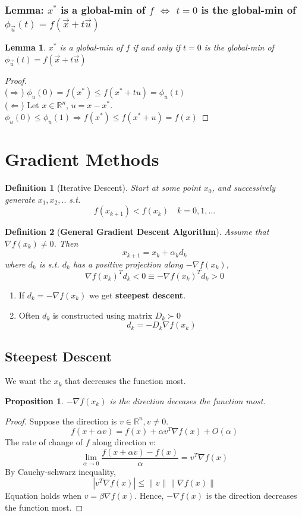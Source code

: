 \documentclass[11pt,a4paper]{article}
\newtheorem{proposition}{Proposition}
\newtheorem{lemma}{Lemma}
\newtheorem{definition}{Definition}
\begin{document}
\subsubsection{Lemma: $x^*$ is a global-min of $f$ $\Leftrightarrow$ $t=0$ is the global-min of $\phi_{\vec{u}}(t)=f(\vec{x}+t\vec{u})$}
\begin{lemma}
    $x^*$ is a global-min of $f$ if and only if $t=0$ is the global-min of $\phi_{\vec{u}}(t)=f(\vec{x}+t\vec{u})$
\end{lemma}
\begin{proof}
\quad\\
($\Rightarrow$) $\phi_u (0)=f(x^*)\leq f(x^*+tu)=\phi_u (t)$\\
($\Leftarrow$) Let $x\in \mathbb{R}^n$, $u=x-x^*$. $\phi_u (0)\leq \phi_u (1) \Rightarrow f(x^*)\leq f(x^*+u)=f(x)$
\end{proof}





\section{Gradient Methods}
\begin{definition}[Iterative Descent]
Start at some point $x_0$, and successively generate $x_1,x_2,..$ s.t. $$f(x_{k+1})<f(x_k)\quad k=0,1,...$$
\end{definition}

\begin{definition}[\textbf{General Gradient Descent Algorithm}]
    Assume that $\nabla f(x_k)\neq 0$. Then
    $$x_{k+1}=x_k+\alpha_k d_k$$
    where $d_k$ is s.t. $d_k$ has a positive projection along $-\nabla f(x_k)$,
    $$\nabla f(x_k)^T d_k<0 \equiv -\nabla f(x_k)^T d_k>0$$
\end{definition}
\begin{enumerate}[$\bullet$]
    \item If $d_k=-\nabla f(x_k)$ we get \textbf{steepest descent}.
    \item Often $d_k$ is constructed using matrix $D_k \succ 0$ $$d_k=-D_k\nabla f(x_k)$$
\end{enumerate}

\subsection{Steepest Descent}
We want the $x_k$ that decreases the function most.
\begin{proposition}
$-\nabla f(x_k)$ is the direction deceases the function most.
\end{proposition}
\begin{proof}
Suppose the direction is $v\in \mathbb{R}^n, v\neq 0$.
$$f(x+\alpha v)=f(x)+\alpha v^T \nabla f(x)+O(\alpha)$$
The rate of change of $f$ along direction $v$:
$$\lim_{\alpha \rightarrow 0}\frac{f(x+\alpha v)-f(x)}{\alpha}=v^T\nabla f(x)$$
By Cauchy-schwarz inequality,
$$|v^T\nabla f(x)|\leq \|v\|\|\nabla f(x)\|$$
Equation holds when $v=\beta \nabla f(x)$. Hence, $-\nabla f(x)$ is the direction decreases the function most.
\end{proof}
\end{document}
